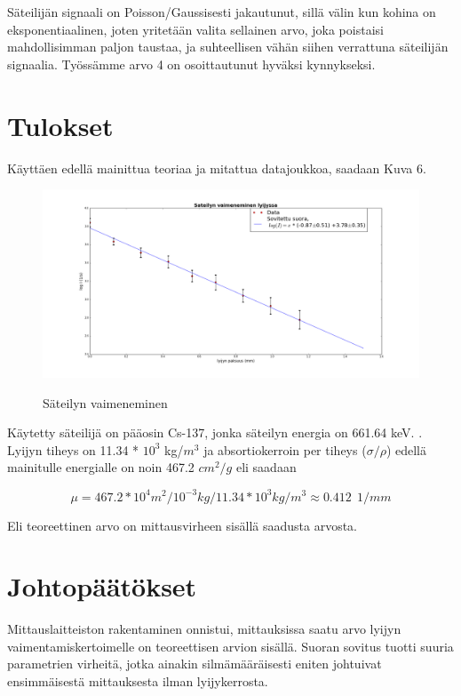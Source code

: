 \documentclass[a4paper, 12pt]{article}
\begin{document}
Säteilijän signaali on Poisson/Gaussisesti jakautunut, sillä välin kun kohina on eksponentiaalinen, joten yritetään valita sellainen arvo, joka poistaisi mahdollisimman paljon taustaa, ja suhteellisen vähän siihen verrattuna säteilijän signaalia. Työssämme arvo 4 on osoittautunut hyväksi kynnykseksi.

\section{Tulokset}

Käyttäen edellä mainittua teoriaa ja mitattua datajoukkoa, saadaan Kuva 6.

\begin{figure}
\includegraphics[scale=0.45]{../SateilynVaimeneminen}
\label{fig:SateilynVaimeneminen}
\caption{Säteilyn vaimeneminen}
\end{figure}

Käytetty säteilijä on pääosin Cs-137, jonka säteilyn energia on 661.64 keV. \cite{CsEnergy}. Lyijyn tiheys on 11.34 * $10^3$ kg/$m^3$ ja absortiokerroin per tiheys ($\sigma/\rho$) edellä mainitulle energialle on noin 467.2 $cm^2/g$ \cite{GammaLead} eli saadaan 

\begin{equation}
\mu = 467.2 *10^4 m^2 / 10^{-3} kg / 11.34 *10^3 kg/m^3  \approx 0.412\ \ 1/mm
\end{equation}

Eli teoreettinen arvo on mittausvirheen sisällä saadusta arvosta.

\section{Johtopäätökset}

Mittauslaitteiston rakentaminen onnistui, mittauksissa saatu arvo lyijyn vaimentamiskertoimelle on teoreettisen arvion sisällä. Suoran sovitus tuotti suuria parametrien virheitä, jotka ainakin silmämääräisesti eniten johtuivat ensimmäisestä mittauksesta ilman lyijykerrosta.
\end{document}
